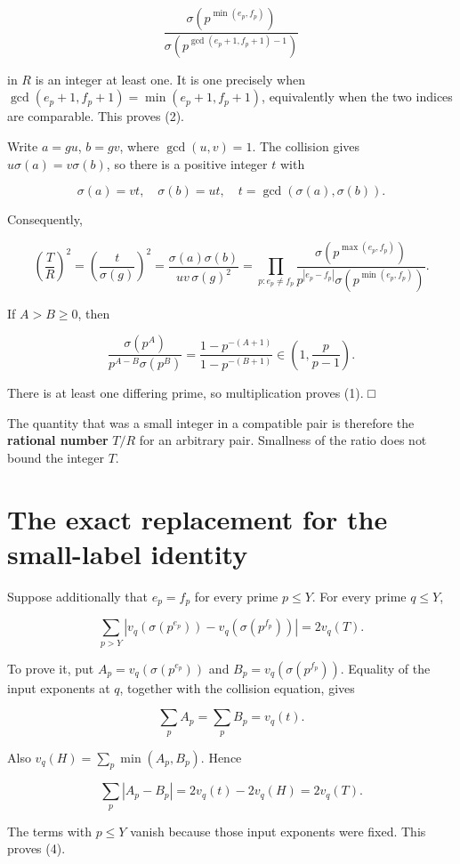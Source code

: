 \[
\frac{\sigma(p^{\min(e_p,f_p)})}
     {\sigma(p^{\gcd(e_p+1,f_p+1)-1})}
\]

in \(R\) is an integer at least one. It is one precisely when \(\gcd(e_p+1,f_p+1)=\min(e_p+1,f_p+1)\), equivalently when the two indices are comparable. This proves (2).

Write \(a=gu\), \(b=gv\), where \(\gcd(u,v)=1\). The collision gives \(u\sigma(a)=v\sigma(b)\), so there is a positive integer \(t\) with

\[
\sigma(a)=vt,\quad\sigma(b)=ut,\quad
 t=\gcd(\sigma(a),\sigma(b)).
\]

Consequently,

\[
\left(\frac TR\right)^2
=\left(\frac t{\sigma(g)}\right)^2
=\frac{\sigma(a)\sigma(b)}{uv\,\sigma(g)^2}
=\prod_{p:e_p\ne f_p}
\frac{\sigma(p^{\max(e_p,f_p)})}
 {p^{|e_p-f_p|}\sigma(p^{\min(e_p,f_p)})}.
\]

If \(A>B\ge0\), then

\[
\frac{\sigma(p^A)}{p^{A-B}\sigma(p^B)}
=\frac{1-p^{-(A+1)}}{1-p^{-(B+1)}}
\in\left(1,\frac p{p-1}\right).
\]

There is at least one differing prime, so multiplication proves (1). □

The quantity that was a small integer in a compatible pair is therefore the \textbf{rational number} \(T/R\) for an arbitrary pair. Smallness of the ratio does not bound the integer \(T\).

\section{The exact replacement for the small-label identity}\label{ratio:the-exact-replacement-for-the-small-label-identity}

Suppose additionally that \(e_p=f_p\) for every prime \(p\le Y\). For every prime \(q\le Y\),

\[
\boxed{
\sum_{p>Y}
\left|v_q(\sigma(p^{e_p}))-v_q(\sigma(p^{f_p}))\right|
=2v_q(T).}
\tag{4}
\]

To prove it, put \(A_p=v_q(\sigma(p^{e_p}))\) and \(B_p=v_q(\sigma(p^{f_p}))\). Equality of the input exponents at \(q\), together with the collision equation, gives

\[
\sum_p A_p=\sum_p B_p=v_q(t).
\]

Also \(v_q(H)=\sum_p\min(A_p,B_p)\). Hence

\[
\sum_p|A_p-B_p|
=2v_q(t)-2v_q(H)=2v_q(T).
\]

The terms with \(p\le Y\) vanish because those input exponents were fixed. This proves (4).

